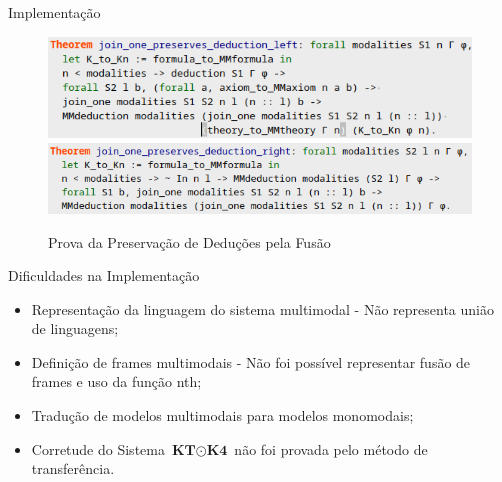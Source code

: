 \documentclass[xcolor=table]{beamer}
\newcommand{\SisT}{\(\textbf{KT} \mathbin{\odot} \textbf{K4}\)\xspace}
\def\texttt#1{#1}%
\begin{document}
    \begin{frame}{Implementação}
        \begin{adjustwidth}{0cm}{}
            \begin{figure}[htbp]
                \centering
                \begin{flushleft}
                    \includegraphics[scale=.5]{Figuras/ProvaJoinOnePreservaDeducao1.png}
                    \includegraphics[scale=.5]{Figuras/ProvaJoinOnePreservaDeducao2.png}
                \end{flushleft}
                \caption{Prova da Preservação de Deduções pela Fusão}
            \end{figure}
        \end{adjustwidth}
    \end{frame}

    \begin{frame}{Dificuldades na Implementação}
        \begin{itemize}
            \item Representação da linguagem do sistema multimodal - Não representa união de linguagens;
            \item Definição de frames multimodais - Não foi possível representar fusão de frames e uso da função \texttt{nth};
            \item Tradução de modelos multimodais para modelos monomodais;
            \item Corretude do Sistema \SisT não foi provada pelo método de transferência.
        \end{itemize}
    \end{frame}
\end{document}
